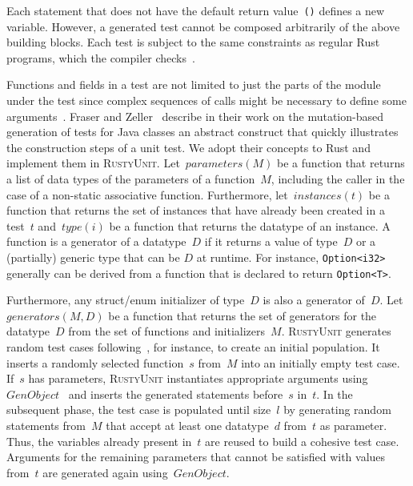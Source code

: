 \documentclass[paper=a4,%
  twoside,%
  BCOR4mm,%
  abstract=true,%
  toc=bibliography,%
  chapterprefix=true,%
  toc=bibliographynumbered,%
  open=right,%
  english,%
  pagesize=pdftex]{scrreprt}
\newcommand{\tech}{\textsc{RustyUnit}\xspace}
\begin{document}
Each statement that does not have the default return value~\texttt{()} defines a new variable. However, a generated test cannot be composed arbitrarily of the above building blocks. Each test is subject to the same constraints as regular Rust programs, which the compiler checks~\cite{Tonella2004}.



Functions and fields in a test are not limited to just the parts of the module under the test since complex sequences of calls might be necessary to define some arguments~\cite{Fraser2012}. Fraser and Zeller~\cite{Fraser2012} describe in their work on the mutation-based generation of tests for Java classes an abstract construct that quickly illustrates the construction steps of a unit test. We adopt their concepts to Rust and implement them in \tech. Let~$parameters(M)$ be a function that returns a list of data types of the parameters of a function~$M$, including the caller in the case of a non-static associative function. Furthermore, let~$instances(t)$ be a function that returns the set of instances that have already been created in a test~$t$ and~$type(i)$ be a function that returns the datatype of an instance. A function is a generator of a datatype~$D$ if it returns a value of type~$D$ or a (partially) generic type that can be $D$ at runtime. For instance, \texttt{Option<i32>} generally can be derived from a function that is declared to return \texttt{Option<T>}.

Furthermore, any struct/enum initializer of type~$D$ is also a generator of~$D$. Let~$generators(M,D)$ be a function that returns the set of generators for the datatype~$D$ from the set of functions and initializers~$M$. \tech generates random test cases following~, for instance, to create an initial population. It inserts a randomly selected function~$s$ from~$M$ into an initially empty test case. If~$s$ has parameters, \tech instantiates appropriate arguments using $GenObject$~ and inserts the generated statements before~$s$ in~$t$. In the subsequent phase, the test case is populated until size~$l$ by generating random statements from~$M$ that accept at least one datatype~$d$ from~$t$ as parameter. Thus, the variables already present in~$t$ are reused to build a cohesive test case. Arguments for the remaining parameters that cannot be satisfied with values from~$t$ are generated again using~$GenObject$.
\end{document}
